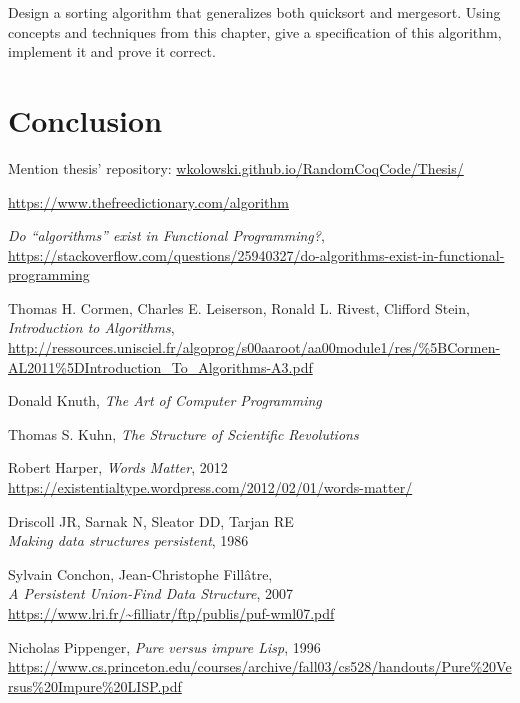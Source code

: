 \documentclass[declaration,mgr,english,shortabstract]{iithesis}
\begin{document}
Design a sorting algorithm that generalizes both quicksort and mergesort. Using concepts and techniques from this chapter, give a specification of this algorithm, implement it and prove it correct.

\chapter{Conclusion}

Mention thesis' repository: \url{wkolowski.github.io/RandomCoqCode/Thesis/}


\begin{thebibliography}{1}

    \url{https://www.thefreedictionary.com/algorithm}

    \textit{Do ``algorithms'' exist in Functional Programming?}, \\
    \url{https://stackoverflow.com/questions/25940327/do-algorithms-exist-in-functional-programming}

    Thomas H. Cormen, Charles E. Leiserson, Ronald L. Rivest, Clifford Stein, \\
    \textit{Introduction to Algorithms}, \\
    \url{http://ressources.unisciel.fr/algoprog/s00aaroot/aa00module1/res/%5BCormen-AL2011%5DIntroduction_To_Algorithms-A3.pdf}

    Donald Knuth, \textit{The Art of Computer Programming}

    Thomas S. Kuhn, \textit{The Structure of Scientific Revolutions}

    Robert Harper, \textit{Words Matter}, 2012 \\
    \url{https://existentialtype.wordpress.com/2012/02/01/words-matter/}

    Driscoll JR, Sarnak N, Sleator DD, Tarjan RE \\
    \textit{Making data structures persistent}, 1986

    Sylvain Conchon, Jean-Christophe Fillâtre, \\
    \textit{A Persistent Union-Find Data Structure}, 2007 \\
    \url{https://www.lri.fr/~filliatr/ftp/publis/puf-wml07.pdf}

    Nicholas Pippenger, \textit{Pure versus impure Lisp}, 1996 \\
    \url{https://www.cs.princeton.edu/courses/archive/fall03/cs528/handouts/Pure%20Versus%20Impure%20LISP.pdf}


\end{thebibliography}
\end{document}
